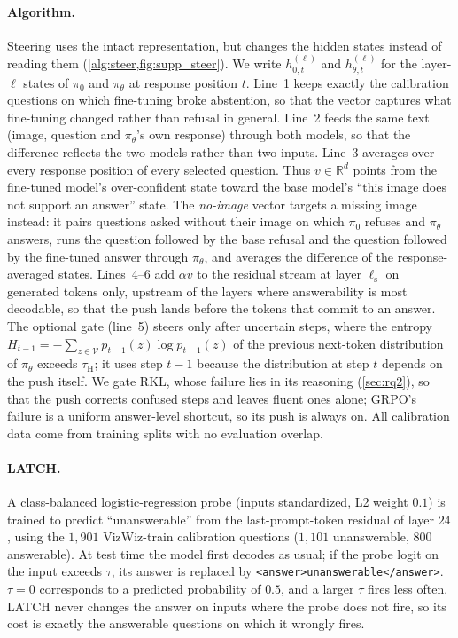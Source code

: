 \paragraph{Algorithm.}
Steering uses the intact representation, but changes the hidden states instead
of reading them (\cref{alg:steer,fig:supp_steer}). We write $h^{(\ell)}_{0,t}$ and $h^{(\ell)}_{\theta,t}$
for the layer-$\ell$ states of $\pi_0$ and $\pi_\theta$ at response position $t$. Line~1
keeps exactly the calibration questions on which fine-tuning broke abstention, so that the
vector captures what fine-tuning changed rather than refusal in general. Line~2 feeds the
same text (image, question and $\pi_\theta$'s own response) through both models, so that the
difference reflects the two models rather than two inputs. Line~3 averages over every
response position of every selected question. Thus $v \in \mathbb{R}^{d}$ points from the
fine-tuned model's over-confident state toward the base model's ``this image does not
support an answer'' state. The \emph{no-image} vector targets a missing image instead: it
pairs questions asked without their image on which $\pi_0$ refuses and $\pi_\theta$
answers, runs the question followed by the base refusal and the question followed by the
fine-tuned answer through $\pi_\theta$, and averages the difference of the
response-averaged states. Lines~4--6 add $\alpha v$ to the residual stream at layer
$\ell_{\mathrm{s}}$ on generated tokens only, upstream of the layers where answerability is
most decodable, so that the push lands before the tokens that commit to an answer. The
optional gate (line~5) steers only after uncertain steps, where the entropy
$H_{t-1} = -\sum_{z \in \mathcal{V}} p_{t-1}(z) \log p_{t-1}(z)$ of the previous
next-token distribution of $\pi_\theta$ exceeds $\tau_{\mathrm{H}}$; it uses step $t-1$
because the distribution at step $t$ depends on the push itself. We gate RKL, whose failure
lies in its reasoning (\cref{sec:rq2}), so that the push corrects confused steps and leaves
fluent ones alone; GRPO's failure is a uniform answer-level shortcut, so its push is always
on. All calibration data come from training splits with no evaluation overlap.

\paragraph{LATCH.}
A class-balanced logistic-regression probe (inputs standardized, L2 weight $0.1$) is trained
to predict ``unanswerable'' from the last-prompt-token residual of layer $24$, using the
$1{,}901$ VizWiz-train calibration questions ($1{,}101$ unanswerable, $800$ answerable). At
test time the model first decodes as usual; if the probe logit on the input exceeds $\tau$,
its answer is replaced by \texttt{<answer>unanswerable</answer>}. $\tau{=}0$ corresponds to
a predicted probability of $0.5$, and a larger $\tau$ fires less often. LATCH never
changes the answer on inputs where the probe does not fire, so its cost is exactly the
answerable questions on which it wrongly fires.


